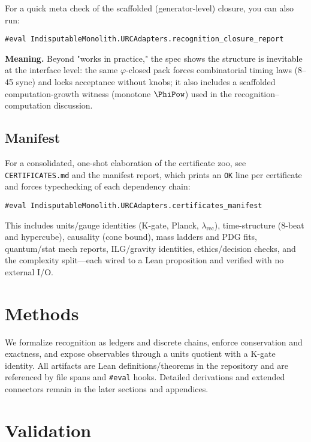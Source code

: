 \documentclass[11pt,a4paper,twoside]{article}
\numberwithin{equation}{section}
\renewcommand{\phi}{\varphi}
\theoremstyle{customthm}
\theoremstyle{customdef}
\theoremstyle{customrem}
\begin{document}
For a quick meta check of the scaffolded (generator-level) closure, you can also run:

\begin{lstlisting}
#eval IndisputableMonolith.URCAdapters.recognition_closure_report
\end{lstlisting}

\textbf{Meaning.} Beyond "works in practice," the spec shows the structure is inevitable at the interface level: the same \(\phi\)-closed pack forces combinatorial timing laws (8–45 sync) and locks acceptance without knobs; it also includes a scaffolded computation-growth witness (monotone \(\PhiPow\)) used in the recognition–computation discussion.

\subsection{Manifest}

For a consolidated, one-shot elaboration of the certificate zoo, see \texttt{CERTIFICATES.md} and the manifest report, which prints an \texttt{OK} line per certificate and forces typechecking of each dependency chain:

\begin{lstlisting}
#eval IndisputableMonolith.URCAdapters.certificates_manifest
\end{lstlisting}

This includes units/gauge identities (K-gate, Planck, \(\lambda_{\mathrm{rec}}\)), time-structure (8-beat and hypercube), causality (cone bound), mass ladders and PDG fits, quantum/stat mech reports, ILG/gravity identities, ethics/decision checks, and the complexity split—each wired to a Lean proposition and verified with no external I/O.

\section{Methods}

We formalize recognition as ledgers and discrete chains, enforce conservation and exactness, and expose observables through a units quotient with a K-gate identity. All artifacts are Lean definitions/theorems in the repository and are referenced by file spans and \texttt{\#eval} hooks. Detailed derivations and extended connectors remain in the later sections and appendices.

\section{Validation}
\end{document}
